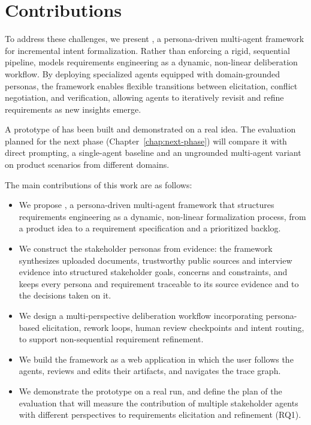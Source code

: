 \section{Contributions}
\label{sec:contributions}

To address these challenges, we present \sysname{}, a persona-driven multi-agent framework for incremental intent formalization. Rather than enforcing a rigid, sequential pipeline, \sysname{} models requirements engineering as a dynamic, non-linear deliberation workflow. By deploying specialized agents equipped with domain-grounded personas, the framework enables flexible transitions between elicitation, conflict negotiation, and verification, allowing agents to iteratively revisit and refine requirements as new insights emerge.

A prototype of \sysname{} has been built and demonstrated on a real idea. The evaluation planned for the next phase (Chapter~\ref{chap:next-phase}) will compare it with direct prompting, a single-agent baseline and an ungrounded multi-agent variant on product scenarios from different domains.

The main contributions of this work are as follows:
\begin{itemize}
    \item We propose \sysname{}, a persona-driven multi-agent framework that structures requirements engineering as a dynamic, non-linear formalization process, from a product idea to a requirement specification and a prioritized backlog.
    \item We construct the stakeholder personas from evidence: the framework synthesizes uploaded documents, trustworthy public sources and interview evidence into structured stakeholder goals, concerns and constraints, and keeps every persona and requirement traceable to its source evidence and to the decisions taken on it.
    \item We design a multi-perspective deliberation workflow incorporating persona-based elicitation, rework loops, human review checkpoints and intent routing, to support non-sequential requirement refinement.
    \item We build the framework as a web application in which the user follows the agents, reviews and edits their artifacts, and navigates the trace graph.
    \item We demonstrate the prototype on a real run, and define the plan of the evaluation that will measure the contribution of multiple stakeholder agents with different perspectives to requirements elicitation and refinement (RQ1).
\end{itemize}
